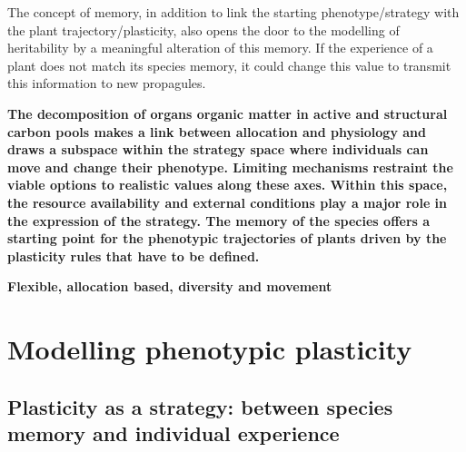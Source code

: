  
 The concept of memory, in addition to link the starting phenotype/strategy with the plant trajectory/plasticity, also opens the door to the modelling of heritability by a meaningful alteration of this memory. If the experience of a plant does not match its species memory, it could change this value to transmit this information to new propagules.

%

%





\textbf{The decomposition of organs organic matter in active and structural carbon pools makes a link between allocation and physiology and draws a subspace within the strategy space where individuals can move and change their phenotype. Limiting mechanisms restraint the viable options to realistic values along these axes. Within this space, the resource availability and external conditions play a major role in the expression of the strategy. The memory of the species offers a starting point for the phenotypic trajectories of plants driven by the plasticity rules that have to be defined.\\ %
}


\textbf{Flexible, allocation based, diversity and movement}

\chapter{Modelling phenotypic plasticity}\label{chapter:modelling_PP}


\section{Plasticity as a strategy: between species memory and individual experience}

